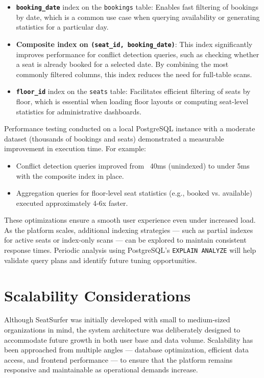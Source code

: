 \documentclass[12pt,a4paper]{report} %
\begin{document}
\begin{itemize}
\item \textbf{\texttt{booking\_date}} index on the \texttt{bookings} table: Enables fast filtering of bookings by date, which is a common use case when querying availability or generating statistics for a particular day.
\item \textbf{Composite index on \texttt{(seat\_id, booking\_date)}}: This index significantly improves performance for conflict detection queries, such as checking whether a seat is already booked for a selected date. By combining the most commonly filtered columns, this index reduces the need for full-table scans.
\item \textbf{\texttt{floor\_id}} index on the \texttt{seats} table: Facilitates efficient filtering of seats by floor, which is essential when loading floor layouts or computing seat-level statistics for administrative dashboards.
\end{itemize}

Performance testing conducted on a local PostgreSQL instance with a moderate dataset (thousands of bookings and seats) demonstrated a measurable improvement in execution time. For example:

\begin{itemize}
\item Conflict detection queries improved from ~40ms (unindexed) to under 5ms with the composite index in place.
\item Aggregation queries for floor-level seat statistics (e.g., booked vs. available) executed approximately 4-6x faster.
\end{itemize}

These optimizations ensure a smooth user experience even under increased load. As the platform scales, additional indexing strategies — such as partial indexes for active seats or index-only scans — can be explored to maintain consistent response times. Periodic analysis using PostgreSQL's \texttt{EXPLAIN ANALYZE} will help validate query plans and identify future tuning opportunities.

\section{Scalability Considerations}

Although SeatSurfer was initially developed with small to medium-sized organizations in mind, the system architecture was deliberately designed to accommodate future growth in both user base and data volume. Scalability has been approached from multiple angles — database optimization, efficient data access, and frontend performance — to ensure that the platform remains responsive and maintainable as operational demands increase.
\end{document}
